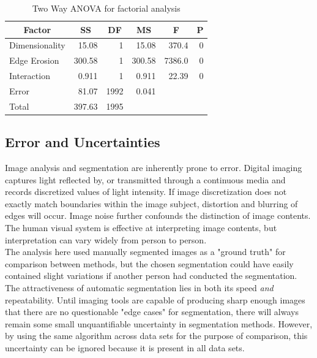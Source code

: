 \documentclass[11pt, twocolumn]{article}
\begin{document}
\begin{table}[htbp]
	\centering
	\caption{Two Way ANOVA for factorial analysis}
	\begin{tabular}{|lrrrrr|}
		\toprule
		\multicolumn{1}{|c}{Factor} & \multicolumn{1}{c}{SS} & \multicolumn{1}{c}{DF} & \multicolumn{1}{c}{MS} & \multicolumn{1}{c}{F} & \multicolumn{1}{c|}{P } \\
		\midrule
		Dimensionality & 15.08 & 1     & 15.08 & 370.4 & 0 \\
		Edge Erosion & 300.58 & 1     & 300.58 & 7386.0 & 0 \\
		Interaction & 0.911 & 1     & 0.911 & 22.39 & 0 \\
		Error & 81.07 & 1992  & 0.041 &       &  \\
		Total & 397.63 & 1995  &       &       &  \\
		\bottomrule
	\end{tabular}%
	\label{tab:TwoWay}%
\end{table}%


\subsection{Error and Uncertainties} 
Image analysis and segmentation are inherently prone to error. Digital imaging captures light reflected by, or transmitted through a continuous media and records discretized values of light intensity. If image discretization does not exactly match boundaries within the image subject, distortion and blurring of edges will occur. Image noise further confounds the distinction of image contents. The human visual system is effective at interpreting image contents, but interpretation can vary widely from person to person.\\
The analysis here used manually segmented images as a "ground truth" for comparison between methods, but the chosen segmentation could have easily contained slight variations if another person had conducted the segmentation. The attractiveness of automatic segmentation lies in both its speed \textit{and} repeatability. Until imaging tools are capable of producing sharp enough images that there are no questionable "edge cases" for segmentation, there will always remain some small unquantifiable uncertainty in segmentation methods. However, by using the same algorithm across data sets for the purpose of comparison, this uncertainty can be ignored because it is present in all data sets.
\end{document}
